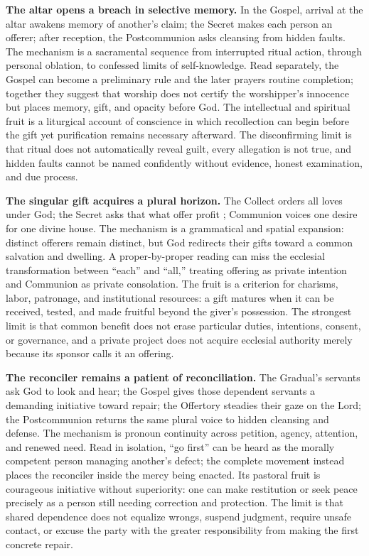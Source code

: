 \noindent\textbf{The altar opens a breach in selective memory.\enspace{}}
\enlargethispage{\baselineskip}
In the Gospel, arrival at the altar awakens memory of another's claim; the Secret makes each person an offerer; after reception, the Postcommunion asks cleansing from hidden faults. The mechanism is a sacramental sequence from interrupted ritual action, through personal oblation, to confessed limits of self-knowledge. Read separately, the Gospel can become a preliminary rule and the later prayers routine completion; together they suggest that worship does not certify the worshipper's innocence but places memory, gift, and opacity before God. The intellectual and spiritual fruit is a liturgical account of conscience in which recollection can begin before the gift yet purification remains necessary afterward. The disconfirming limit is that ritual does not automatically reveal guilt, every allegation is not true, and hidden faults cannot be named confidently without evidence, honest examination, and due process.

\noindent\textbf{The singular gift acquires a plural horizon.\enspace{}}
The Collect orders all loves under God; the Secret asks that what  offer profit ; Communion voices one desire for one divine house. The mechanism is a grammatical and spatial expansion: distinct offerers remain distinct, but God redirects their gifts toward a common salvation and dwelling. A proper-by-proper reading can miss the ecclesial transformation between ``each'' and ``all,'' treating offering as private intention and Communion as private consolation. The fruit is a criterion for charisms, labor, patronage, and institutional resources: a gift matures when it can be received, tested, and made fruitful beyond the giver's possession. The strongest limit is that common benefit does not erase particular duties, intentions, consent, or governance, and a private project does not acquire ecclesial authority merely because its sponsor calls it an offering.

\noindent\textbf{The reconciler remains a patient of reconciliation.\enspace{}}
The Gradual's servants ask God to look and hear; the Gospel gives those dependent servants a demanding initiative toward repair; the Offertory steadies their gaze on the Lord; the Postcommunion returns the same plural voice to hidden cleansing and defense. The mechanism is pronoun continuity across petition, agency, attention, and renewed need. Read in isolation, ``go first'' can be heard as the morally competent person managing another's defect; the complete movement instead places the reconciler inside the mercy being enacted. Its pastoral fruit is courageous initiative without superiority: one can make restitution or seek peace precisely as a person still needing correction and protection. The limit is that shared dependence does not equalize wrongs, suspend judgment, require unsafe contact, or excuse the party with the greater responsibility from making the first concrete repair.
